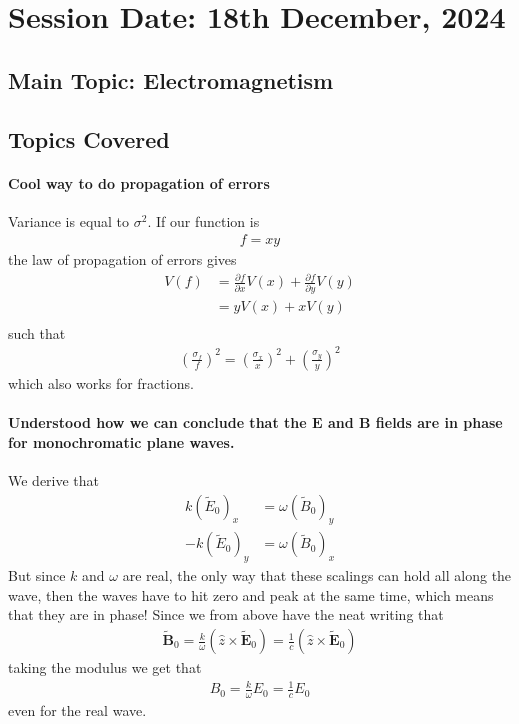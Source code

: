 \section{Session Date: 18th December, 2024}
\subsection*{Main Topic: Electromagnetism}
\subsection*{Topics Covered}
\paragraph{Cool way to do propagation of errors}
Variance is equal to \(\sigma^{2}\). If our function is \begin{align*}
    f = xy
\end{align*}
the law of propagation of errors gives \begin{align*}
    V(f) &= \frac{\partial f}{\partial x}V(x) + \frac{\partial f}{\partial y} V(y)\\
    &= y V(x) + xV(y)\\
\end{align*}
such that \begin{align*}
    \left( \frac{\sigma _f}{f} \right)^{2} = \left( \frac{\sigma_x}{x} \right) ^{2} + \left( \frac{\sigma _y}{y} \right) ^{2} 
\end{align*}
which also works for fractions.

\paragraph{Understood how we can conclude that the \(\mathbf{E}\) and \(\mathbf{B}\) fields are in phase for monochromatic plane waves.}
We derive that \begin{align*}
    k(\tilde{E}_0)_x &= \omega (\tilde{B}_0)_y\\
    -k(\tilde{E}_0)_y &= \omega (\tilde{B}_0)_x
\end{align*}
But since \(k\) and \(\omega \) are real, the only way that these scalings can hold all along the wave, then the waves have to hit zero and peak at the same time, which means that they are in phase! Since we from above have the neat writing that \begin{align*}
    \tilde{\mathbf{B}}_0 = \frac{k}{\omega} (\hat{z} \times \tilde{\mathbf{E}}_0) = \frac{1}{c}(\hat{z} \times \tilde{\mathbf{E}}_0)
\end{align*}
taking the modulus we get that \begin{align*}
    B_0 = \frac{k}{\omega }E_0 = \frac{1}{c} E_0
\end{align*}
even for the real wave.
